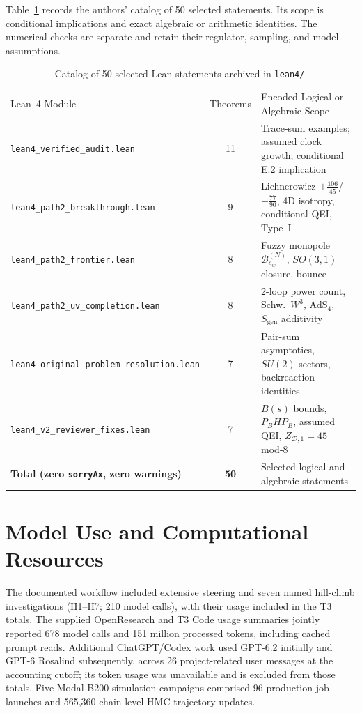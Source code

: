 \documentclass[onecolumn,11pt,aps,prd,amsmath,amssymb,nofootinbib,floatfix]{revtex4-2}
\newcommand{\scrD}{\mathscr{D}}
\newcommand{\calB}{\mathcal{B}}
\begin{document}
Table~\ref{tab:lean} records the authors' catalog of 50 selected statements. Its scope is conditional implications and exact algebraic or arithmetic identities. The numerical checks are separate and retain their regulator, sampling, and model assumptions.

\begin{table}[t]
\caption{Catalog of 50 selected Lean statements archived in \texttt{lean4/}.}
\label{tab:lean}
\begin{ruledtabular}
\begin{tabular}{p{}cp{}}
Lean~4 Module & Theorems & Encoded Logical or Algebraic Scope \\
\colrule
{\footnotesize\texttt{lean4\_verified\_audit.lean}} & 11 & Trace-sum examples; assumed clock growth; conditional E.2 implication \\
{\footnotesize\texttt{lean4\_path2\_breakthrough.lean}} & 9 & Lichnerowicz $+\frac{106}{45}$/$+\frac{77}{90}$, 4D isotropy, conditional QEI, Type~I \\
{\footnotesize\texttt{lean4\_path2\_frontier.lean}} & 8 & Fuzzy monopole $\calB_{s_w}^{(N)}$, $SO(3,1)$ closure, bounce \\
{\footnotesize\texttt{lean4\_path2\_uv\_completion.lean}} & 8 & 2-loop power count, Schw.\ $W^3$, $\mathrm{AdS}_4$, $S_{\mathrm{gen}}$ additivity \\
{\footnotesize\texttt{lean4\_original\_problem\_resolution.lean}} & 7 & Pair-sum asymptotics, $SU(2)$ sectors, backreaction identities \\
{\footnotesize\texttt{lean4\_v2\_reviewer\_fixes.lean}} & 7 & $B(s)$ bounds, $P_B H P_B$, assumed QEI, $Z_{\scrD,1}=45$ mod-8 \\
\colrule
\textbf{Total (zero \texttt{sorryAx}, zero warnings)} & \textbf{50} & Selected logical and algebraic statements \\
\end{tabular}
\end{ruledtabular}
\end{table}



\section{Model Use and Computational Resources}\label{app:model_use}

The documented workflow included extensive steering and seven named hill-climb investigations (H1--H7; 210 model calls), with their usage included in the T3 totals. The supplied OpenResearch and T3 Code usage summaries jointly reported 678 model calls and 151 million processed tokens, including cached prompt reads. Additional ChatGPT/Codex work used GPT-6.2 initially and GPT-6 Rosalind subsequently, across 26 project-related user messages at the accounting cutoff; its token usage was unavailable and is excluded from those totals. Five Modal B200 simulation campaigns comprised 96 production job launches and 565{,}360 chain-level HMC trajectory updates.
\end{document}
